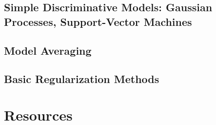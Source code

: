\documentclass{beamer}
\begin{document}
    \subsection{Simple Discriminative Models: Gaussian Processes, Support-Vector Machines} 
    \subsection{Model Averaging}                                             
    \subsection{Basic Regularization Methods}                                
\section{Resources}                                                          
\end{document}
